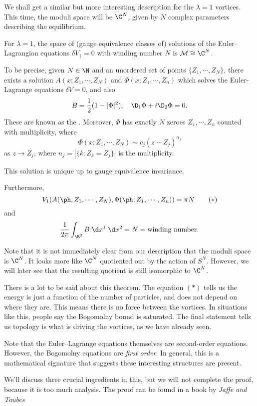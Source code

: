 \documentclass[a4paper]{article}
\begin{document}
We shall get a similar but more interesting description for the $\lambda = 1$ vortices. This time, the moduli space will be $\C^N$, given by $N$ complex parameters describing the equilibrium.

\begin{thm}
  For $\lambda = 1$, the space of (gauge equivalence classes of) solutions of the Euler--Lagrangian equations $\delta V_1 = 0$ with winding number $N$ is $\mathcal{M} \cong \C^N$.

  To be precise, given $N \in \N$ and an unordered set of points $\{Z_1, \cdots, Z_N\}$, there exists a solution $A(x; Z_1, \cdots, Z_N)$ and $\Phi(x; Z_1, \cdots, Z_n)$ which solves the Euler-Lagrange equations $\delta V = 0$, and also
  \[
    B = \frac{1}{2} (1 - |\Phi|^2),\quad \D_1 \Phi + i \D_2 \Phi = 0.
  \]
  These are known as the . Moreover, $\Phi$ has exactly $N$ zeroes $Z_1, \cdots, Z_n$ counted with multiplicity, where
  \[
    \Phi(x; Z_1, \cdots, Z_N) \sim c_j (z - Z_j)^{n_j}
  \]
  as $z \to Z_j$, where $n_j = |\{k: Z_k = Z_j\}|$ is the multiplicity.

  This solution is unique up to gauge equivalence invariance.

  Furthermore,
  \[
    V_1(A(\ph, Z_1, \cdots, Z_N), \Phi(\ph; Z_1, \cdots, Z_n)) = \pi N\tag{$*$}
  \]
  and
  \[
    \frac{1}{2\pi} \int_{\R^2} B\;\d x^1 \;\d x^2 = N = \text{winding number}.
  \]
\end{thm}
Note that it is not immediately clear from our description that the moduli space is $\C^N$. It looks more like $\C^N$ quotiented out by the action of $S^N$. However, we will later see that the resulting quotient is still isomorphic to $\C^N$.

There is a lot to be said about this theorem. The equation $(*)$ tells us the energy is just a function of the number of particles, and does not depend on where they are. This means there is no force between the vortices. In situations like this, people say the Bogomolny bound is saturated. The final statement tells us topology is what is driving the vortices, as we have already seen.

Note that the Euler--Lagrange equations themselves are second-order equations. However, the Bogomolny equations are \emph{first order}. In general, this is a mathematical signature that suggests these interesting structures are present.

We'll discuss three crucial ingredients in this, but we will not complete the proof, because it is too much analysis. The proof can be found in a book by \emph{Jaffe and Taubes}
\end{document}
